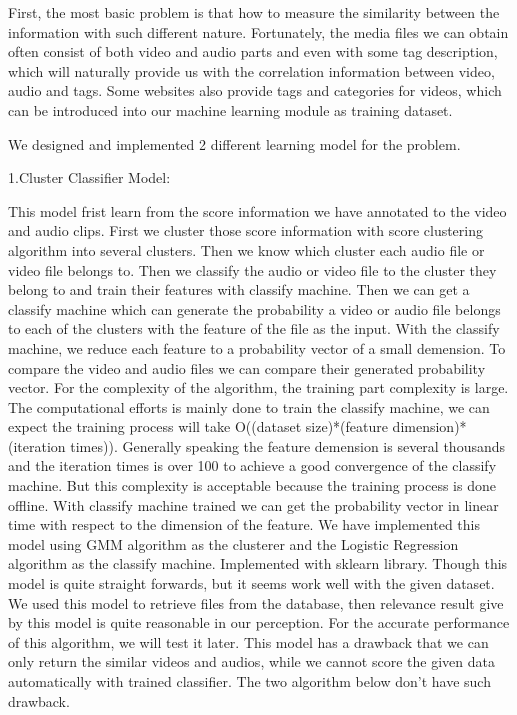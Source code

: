 \documentclass{report}
\begin{document}
First, the most basic problem is that how to measure the similarity between the information with such different nature. Fortunately, the media files we can obtain often consist of both video and audio parts and even with some tag description, which will naturally provide us with the correlation information between video, audio and tags. Some websites also provide tags and categories for videos, which can be introduced into our machine learning module as training dataset.
 
We designed and implemented 2 different learning model for the problem.

1.Cluster Classifier Model:

This model frist learn from the score information we have annotated to the video and audio clips. First we cluster those score information with score clustering algorithm into several clusters. Then we know which cluster each audio file or video file belongs to. Then we classify the audio or video file to the cluster they belong to and train their features with classify machine. Then we can get a classify machine which can generate the probability a video or audio file belongs to each of the clusters with the feature of the file as the input. With the classify machine, we reduce each feature to a probability vector of a small demension. To compare the video and audio files we can compare their generated probability vector. 
For the complexity of the algorithm, the training part complexity is large. The computational efforts is mainly done to train the classify machine, we can expect the training process will take O((dataset size)*(feature dimension)*(iteration times)). Generally speaking the feature demension is several thousands and the iteration times is over 100 to achieve a good convergence of the classify machine. But this complexity is acceptable because the training process is done offline. With classify machine trained we can get the probability vector in linear time with respect to the dimension of the feature.
We have implemented this model using GMM algorithm as the clusterer and the Logistic Regression algorithm as the classify machine. Implemented with sklearn library.
Though this model is quite straight forwards, but it seems work well with the given dataset. We used this model to retrieve files from the database, then relevance result give by this model is quite reasonable in our perception. For the accurate performance of this algorithm, we will test it later.
This model has a drawback that we can only return the similar videos and audios, while we cannot score the given data automatically with trained classifier. The two algorithm below don’t have such drawback.
\end{document}
